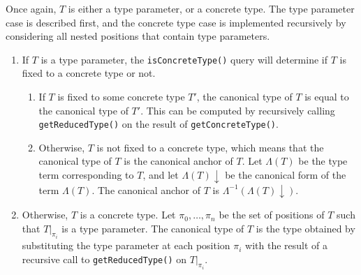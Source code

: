 \documentclass[../generics]{subfiles}
\begin{document}
\begin{algorithm}\label{alg:get reduced type}
Once again, $T$ is either a type parameter, or a concrete type. The type parameter case is described first, and the concrete type case is implemented recursively by considering all nested positions that contain type parameters.
\begin{enumerate}
\item
If $T$ is a type parameter, the \texttt{isConcreteType()} query will determine if $T$ is fixed to a concrete type or not.
\begin{enumerate}
\item If $T$ is fixed to some concrete type $T'$, the canonical type of $T$ is equal to the canonical type of $T'$. This can be computed by recursively calling \texttt{getReducedType()} on the result of \texttt{getConcreteType()}.
\item Otherwise, $T$ is not fixed to a concrete type, which means that the canonical type of $T$ is the canonical anchor of $T$. Let $\Lambda(T)$ be the type term corresponding to $T$, and let $\Lambda(T){\downarrow}$ be the canonical form of the term $\Lambda(T)$. The canonical anchor of $T$ is $\Lambda^{-1}(\Lambda(T){\downarrow})$.
\end{enumerate}

\item
Otherwise, $T$ is a concrete type. Let $\pi_0,\ldots,\pi_n$ be the set of positions of $T$ such
that $T|_{\pi_i}$ is a type parameter. The canonical type of $T$ is the type obtained by substituting the type parameter at each position $\pi_i$ with the result of a recursive call to \texttt{getReducedType()} on $T|_{\pi_i}$.
\end{enumerate}
\end{algorithm}
\end{document}
